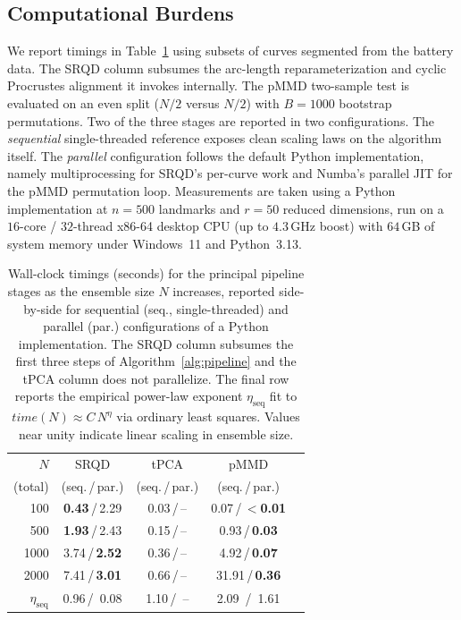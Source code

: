 \documentclass[pdflatex,iicol]{sn-jnl}%
\theoremstyle{thmstyleone}%
\theoremstyle{thmstyletwo}%
\theoremstyle{thmstylethree}%
\begin{document}
\subsection{Computational Burdens}
We report timings in Table~\ref{tab:timing} using subsets of curves segmented from the battery data. The SRQD column subsumes the arc-length reparameterization and cyclic Procrustes alignment it invokes internally. The pMMD two-sample test is evaluated on an even split ($N/2$ versus $N/2$) with $B = 1000$ bootstrap permutations. Two of the three stages are reported in two configurations. The \emph{sequential} single-threaded reference exposes clean scaling laws on the algorithm itself. The \emph{parallel} configuration follows the default Python implementation, namely multiprocessing for SRQD's per-curve work and Numba's parallel JIT for the pMMD permutation loop. Measurements are taken using a Python implementation at $n=500$ landmarks and $r=50$ reduced dimensions, run on a $16$-core / $32$-thread x86-64 desktop CPU (up to $4.3$\,GHz boost) with $64$\,GB of system memory under Windows~11 and Python~3.13.

\begin{table}
    \centering
    \begin{tabular}{r|cccc}
        $N$ &  SRQD & tPCA & pMMD \\
        (total) & (seq.\,/\,par.) & (seq.\,/\,par.) & (seq.\,/\,par.) \\
        \hline
         100 & \textbf{0.43}\,/\,2.29 & 0.03\,/\,-- &  0.07\,/\,$<$\textbf{0.01} \\
         500 & \textbf{1.93}\,/\,2.43 & 0.15\,/\,-- &  0.93\,/\,\textbf{0.03} \\
        1000 & 3.74\,/\,\textbf{2.52} & 0.36\,/\,-- &  4.92\,/\,\textbf{0.07} \\
        2000 & 7.41\,/\,\textbf{3.01} & 0.66\,/\,-- & 31.91\,/\,\textbf{0.36} \\
        \hline
        $\eta_{\text{seq}}$ & 0.96\,/\, 0.08 & 1.10\,/\, -- & 2.09 \,/\, 1.61 \\
    \end{tabular}
    \caption{Wall-clock timings (seconds) for the principal pipeline stages as the ensemble size $N$ increases, reported side-by-side for sequential (seq., single-threaded) and parallel (par.) configurations of a Python implementation. The SRQD column subsumes the first three steps of Algorithm~\ref{alg:pipeline} and the tPCA column does not parallelize. The final row reports the empirical power-law exponent $\eta_{\text{seq}}$ fit to $time(N) \approx C\, N^{\eta}$ via ordinary least squares. Values near unity indicate linear scaling in ensemble size.}
    \label{tab:timing}
\end{table}
\end{document}
